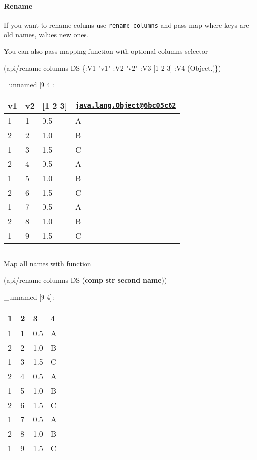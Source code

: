 \documentclass[]{article}
\newenvironment{Shaded}{\begin{snugshade}}{\end{snugshade}}
\newcommand{\AttributeTok}[1]{\textcolor[rgb]{0.77,0.63,0.00}{#1}}
\newcommand{\DecValTok}[1]{\textcolor[rgb]{0.00,0.00,0.81}{#1}}
\newcommand{\KeywordTok}[1]{\textcolor[rgb]{0.13,0.29,0.53}{\textbf{#1}}}
\newcommand{\NormalTok}[1]{#1}
\newcommand{\StringTok}[1]{\textcolor[rgb]{0.31,0.60,0.02}{#1}}
\let\oldparagraph\paragraph
\renewcommand{\paragraph}[1]{\oldparagraph{#1}\mbox{}}
\begin{document}
\hypertarget{rename}{%
\paragraph{Rename}\label{rename}}

If you want to rename colums use \texttt{rename-columns} and pass map
where keys are old names, values new ones.

You can also pass mapping function with optional columns-selector

\begin{Shaded}
\begin{Highlighting}[]
\NormalTok{(api/rename-columns DS \{}\AttributeTok{:V1} \StringTok{"v1"}
                        \AttributeTok{:V2} \StringTok{"v2"}
                        \AttributeTok{:V3}\NormalTok{ [}\DecValTok{1} \DecValTok{2} \DecValTok{3}\NormalTok{]}
                        \AttributeTok{:V4}\NormalTok{ (Object.)\})}
\end{Highlighting}
\end{Shaded}

\_unnamed {[}9 4{]}:

\begin{longtable}[]{@{}llll@{}}
\toprule
v1 & v2 & {[}1 2 3{]} &
\href{mailto:java.lang.Object@6bc05c62}{\nolinkurl{java.lang.Object@6bc05c62}}\tabularnewline
\midrule
\endhead
1 & 1 & 0.5 & A\tabularnewline
2 & 2 & 1.0 & B\tabularnewline
1 & 3 & 1.5 & C\tabularnewline
2 & 4 & 0.5 & A\tabularnewline
1 & 5 & 1.0 & B\tabularnewline
2 & 6 & 1.5 & C\tabularnewline
1 & 7 & 0.5 & A\tabularnewline
2 & 8 & 1.0 & B\tabularnewline
1 & 9 & 1.5 & C\tabularnewline
\bottomrule
\end{longtable}

\begin{center}\rule{0.5\linewidth}{0.5pt}\end{center}

Map all names with function

\begin{Shaded}
\begin{Highlighting}[]
\NormalTok{(api/rename-columns DS (}\KeywordTok{comp} \KeywordTok{str} \KeywordTok{second} \KeywordTok{name}\NormalTok{))}
\end{Highlighting}
\end{Shaded}

\_unnamed {[}9 4{]}:

\begin{longtable}[]{@{}llll@{}}
\toprule
1 & 2 & 3 & 4\tabularnewline
\midrule
\endhead
1 & 1 & 0.5 & A\tabularnewline
2 & 2 & 1.0 & B\tabularnewline
1 & 3 & 1.5 & C\tabularnewline
2 & 4 & 0.5 & A\tabularnewline
1 & 5 & 1.0 & B\tabularnewline
2 & 6 & 1.5 & C\tabularnewline
1 & 7 & 0.5 & A\tabularnewline
2 & 8 & 1.0 & B\tabularnewline
1 & 9 & 1.5 & C\tabularnewline
\bottomrule
\end{longtable}
\end{document}
